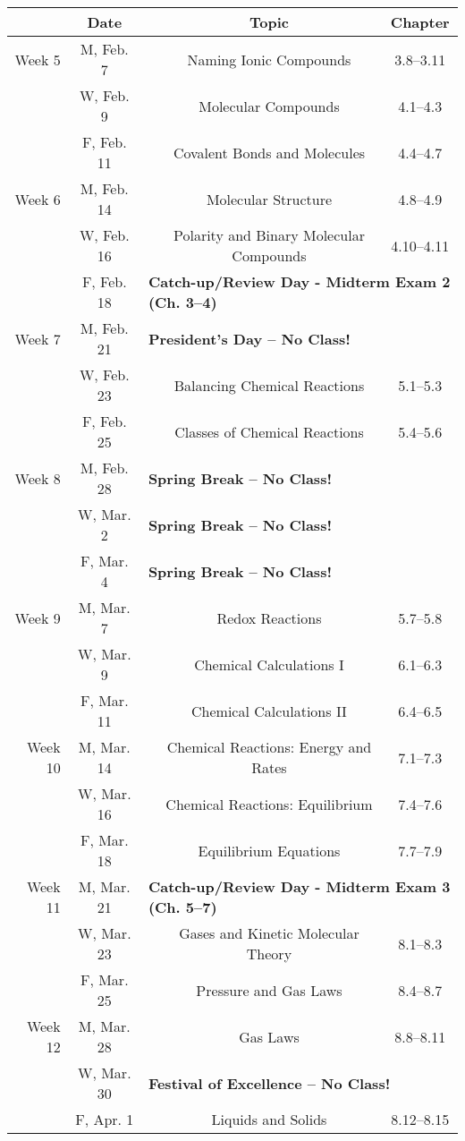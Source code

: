 \documentclass[12pt, letterpaper]{article}
\begin{document}
\begin{tabular}{rcccc}
	& Date && Topic & Chapter\\
	\midrule
	Week 5 & M, Feb. 7&& Naming Ionic Compounds & 3.8--3.11\\
	& W, Feb. 9&& Molecular Compounds & 4.1--4.3\\
	& F, Feb. 11&& Covalent Bonds and Molecules & 4.4--4.7\\
	\midrule
	Week 6 & M, Feb. 14&& Molecular Structure & 4.8--4.9\\
	& W, Feb. 16&& Polarity and Binary Molecular Compounds & 4.10--4.11\\
	& F, Feb. 18& \multicolumn{3}{l}{\textbf{Catch-up/Review Day - Midterm Exam 2 (Ch. 3--4)}}\\
	\midrule
	Week 7 & M, Feb. 21& \multicolumn{3}{l}{\textbf{President's Day -- No Class!}}\\
	& W, Feb. 23&& Balancing Chemical Reactions & 5.1--5.3\\
	& F, Feb. 25&& Classes of Chemical Reactions & 5.4--5.6\\
	\midrule
	Week 8 & M, Feb. 28& \multicolumn{3}{l}{\textbf{Spring Break -- No Class!}}\\
	& W, Mar. 2& \multicolumn{3}{l}{\textbf{Spring Break -- No Class!}}\\
	& F, Mar. 4& \multicolumn{3}{l}{\textbf{Spring Break -- No Class!}}\\
	\midrule
	Week 9 & M, Mar. 7&& Redox Reactions & 5.7--5.8\\
	& W, Mar. 9&& Chemical Calculations I & 6.1--6.3\\
	& F, Mar. 11&& Chemical Calculations II & 6.4--6.5\\
	\midrule
	Week 10 & M, Mar. 14&& Chemical Reactions: Energy and Rates & 7.1--7.3\\
	& W, Mar. 16&& Chemical Reactions: Equilibrium & 7.4--7.6\\
	& F, Mar. 18&& Equilibrium Equations & 7.7--7.9\\
	\midrule
	Week 11 & M, Mar. 21& \multicolumn{3}{l}{\textbf{Catch-up/Review Day - Midterm Exam 3 (Ch. 5--7)}}\\
	& W, Mar. 23&& Gases and Kinetic Molecular Theory & 8.1--8.3\\
	& F, Mar. 25&& Pressure and Gas Laws & 8.4--8.7\\
	\midrule
	Week 12 & M, Mar. 28&& Gas Laws & 8.8--8.11\\
	& W, Mar. 30& \multicolumn{3}{l}{\textbf{Festival of Excellence -- No Class!}}\\
	& F, Apr. 1&& Liquids and Solids & 8.12--8.15\\
\end{tabular}
\end{document}
